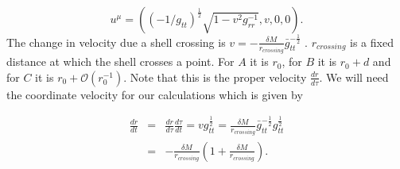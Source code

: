 \documentclass[aps,showpacs,onecolumn,floats,prd,superscriptaddress,nofootinbib]{revtex4-1}
\begin{document}
\begin{equation}
	u^\mu = \left( (-1/g_{tt})^\frac{1}{2} \sqrt{1-v^2g_{rr}^{-1}}, v , 0, 0 \right).	\label{5}
\end{equation}
The change in velocity due a shell crossing is $v = -\frac{\delta M}{r_{crossing}} \bar{g}_{tt}^{-\frac{1}{2}} $ . $r_{crossing}$ is a fixed distance at which the shell crosses a point. For $A$ it is $r_0$, for $B$ it is $r_0 + d$ and for $C$ it is $r_0 + \mathcal{O}(r_0^{-1})$. Note that this is the proper velocity $\frac{dr}{d\tau}$. We will need the coordinate velocity for our calculations which is given by 

\begin{eqnarray}
	\frac{dr}{dt} &=& \frac{dr}{d \tau} \frac{d \tau}{dt} = v g_{tt}^{\frac{1}{2}} =  \frac{\delta M}{r_{crossing}} \bar{g}_{tt}^{-\frac{1}{2}} g_{tt}^\frac{1}{2} \nonumber \\
	&=& -\frac{\delta M}{r_{crossing}} \left( 1 + \frac{\delta M}{r_{crossing}} \right).
\end{eqnarray}
\end{document}
